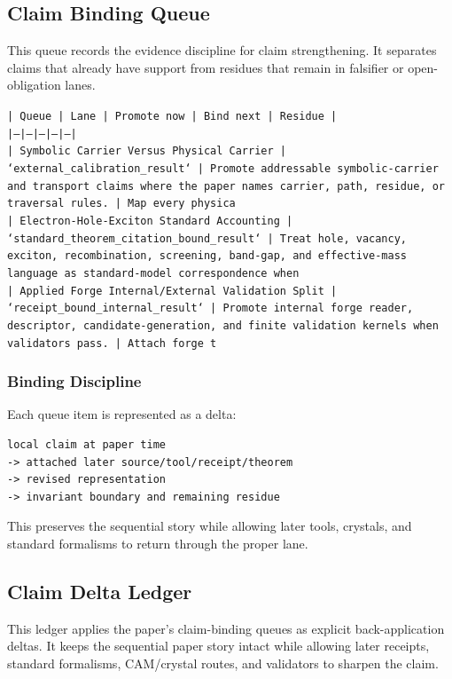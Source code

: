 \documentclass[11pt]{article}
\begin{document}
\subsection*{Claim Binding Queue}

This queue records the evidence discipline for claim strengthening. It separates claims that already have support from residues that remain in falsifier or open-obligation lanes.

\noindent\texttt{| Queue | Lane | Promote now | Bind next | Residue |}\\
\noindent\texttt{|---|---|---|---|---|}\\
\noindent\texttt{| Symbolic Carrier Versus Physical Carrier | `external\_calibration\_result` | Promote addressable symbolic-carrier and transport claims where the paper names carrier, path, residue, or traversal rules. | Map every physica}\\
\noindent\texttt{| Electron-Hole-Exciton Standard Accounting | `standard\_theorem\_citation\_bound\_result` | Treat hole, vacancy, exciton, recombination, screening, band-gap, and effective-mass language as standard-model correspondence when}\\
\noindent\texttt{| Applied Forge Internal/External Validation Split | `receipt\_bound\_internal\_result` | Promote internal forge reader, descriptor, candidate-generation, and finite validation kernels when validators pass. | Attach forge t}\\

\subsubsection*{Binding Discipline}

Each queue item is represented as a delta:

\begin{verbatim}
local claim at paper time
-> attached later source/tool/receipt/theorem
-> revised representation
-> invariant boundary and remaining residue
\end{verbatim}

This preserves the sequential story while allowing later tools, crystals, and
standard formalisms to return through the proper lane.

\subsection*{Claim Delta Ledger}

This ledger applies the paper's claim-binding queues as explicit back-application
deltas. It keeps the sequential paper story intact while allowing later
receipts, standard formalisms, CAM/crystal routes, and validators to sharpen the
claim.
\end{document}
